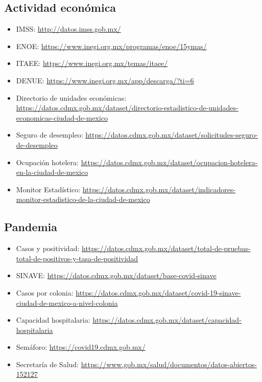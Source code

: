 {\subsection*{Actividad económica}
\begin{itemize}
  \item IMSS: \url{http://datos.imss.gob.mx/}
  \item ENOE: \url{https://www.inegi.org.mx/programas/enoe/15ymas/}
  \item ITAEE: \url{https://www.inegi.org.mx/temas/itaee/}
  \item DENUE: \url{https://www.inegi.org.mx/app/descarga/?ti=6}
  \item Directorio de unidades económicas: \url{https://datos.cdmx.gob.mx/dataset/directorio-estadistico-de-unidades-economicas-ciudad-de-mexico}
  \item Seguro de desempleo: \url{https://datos.cdmx.gob.mx/dataset/solicitudes-seguro-de-desempleo}
  \item Ocupación hotelera: \url{https://datos.cdmx.gob.mx/dataset/ocupacion-hotelera-en-la-ciudad-de-mexico}
  \item Monitor Estadístico: \url{https://datos.cdmx.gob.mx/dataset/indicadores-monitor-estadistico-de-la-ciudad-de-mexico}
\end{itemize}

\subsection*{Pandemia}
\begin{itemize}
  \item Casos y positividad: \url{https://datos.cdmx.gob.mx/dataset/total-de-pruebas-total-de-positivos-y-tasa-de-positividad}
  \item SINAVE: \url{https://datos.cdmx.gob.mx/dataset/base-covid-sinave}
  \item Casos por colonia: \url{https://datos.cdmx.gob.mx/dataset/covid-19-sinave-ciudad-de-mexico-a-nivel-colonia}
  \item Capacidad hospitalaria: \url{https://datos.cdmx.gob.mx/dataset/capacidad-hospitalaria}
  \item Semáforo: \url{https://covid19.cdmx.gob.mx/}
  \item Secretaría de Salud: \url{https://www.gob.mx/salud/documentos/datos-abiertos-152127}
\end{itemize}
}
